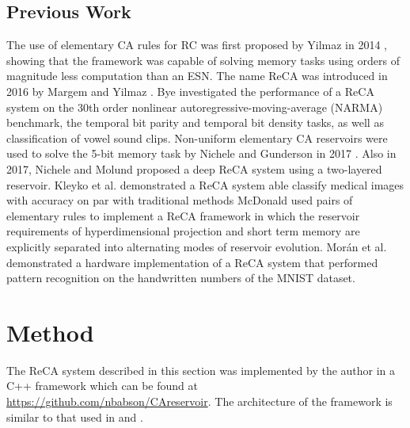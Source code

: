 \documentclass{elsarticle}
\begin{document}
\begin{multicols}{2}
\subsection{Previous Work}

The use of elementary CA rules for RC was first proposed by Yilmaz in 2014 
   \cite{yilmaz2014reservoir}
, showing that the framework was capable of 
   solving memory tasks using orders of magnitude less computation than an ESN.
   The name ReCA was introduced in 2016 by Margem 
   and Yilmaz \cite{margem2017experimental}. Bye \cite{bye2016investigation} investigated the performance 
   of a ReCA system on the 30th order nonlinear autoregressive-moving-average 
   (NARMA) benchmark, the temporal bit parity and temporal bit density tasks, 
   as well as classification of vowel sound clips.  
      Non-uniform elementary CA reservoirs were used to solve the 5-bit memory 
      task by Nichele and Gunderson in 2017 \cite{nichele2017reservoir}. Also 
      in 2017, Nichele and Molund \cite{nichele2017deep}
proposed a deep ReCA system using a 
      two-layered reservoir. Kleyko et al. \cite{kleyko2017modality} 
demonstrated a ReCA system able classify medical images with accuracy on par 
    with traditional methods McDonald \cite{mcdonald2017reservoir} used pairs 
    of elementary rules to implement a ReCA framework in which the reservoir 
    requirements of hyperdimensional projection and short term memory are 
    explicitly separated into alternating modes of reservoir evolution.  
    Mor{\'a}n et al. \cite{moran2018reservoir}
demonstrated a hardware implementation of a ReCA 
    system that performed pattern recognition on the handwritten numbers of the 
    MNIST dataset.
 





\section{Method}\label{method}
The ReCA system described in this section was implemented by the author in a 
C++ framework which can be found at \url{https://github.com/nbabson/CAreservoir}. The 
architecture of the framework is similar to that used in  
\cite{nichele2017deep} and \cite{bye2016investigation}.


\end{multicols}
\end{document}

